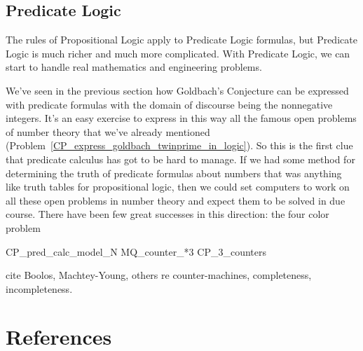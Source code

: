 \begin{problems}

\practiceproblems
{}

\classproblems
{}


\homeworkproblems
{}

\examproblems
{}
\end{problems}

\begin{editingnotes}
\section{Predicate Logic}\label{pred_logic_sec}

The rules of Propositional Logic apply to Predicate Logic formulas,
but Predicate Logic is much richer and much more complicated.  With
Predicate Logic, we can start to handle real mathematics and
engineering problems.

We've seen in the previous section how Goldbach's Conjecture can be
expressed with predicate formulas with the domain of discourse being
the nonnegative integers.  It's an easy exercise to express in this
way all the famous open problems of number theory that we've already
mentioned (Problem~\ref{CP_express_goldbach_twinprime_in_logic}).  So
this is the first clue that predicate calculus has got to be hard to
manage.  If we had some method for determining the truth of predicate
formulas about numbers that was anything like truth tables for
propositional logic, then we could set computers to work on all these
open problems in number theory and expect them to be solved in due
course.  There have been few great successes in this direction: the four color problem

CP\_pred\_calc\_model\_N
MQ\_counter\_*3
CP\_3\_counters

cite Boolos, Machtey-Young, others re counter-machines, completeness,
incompleteness.

\end{editingnotes}

\section{References}

\cite{GareyJohnson70}

\endinput
